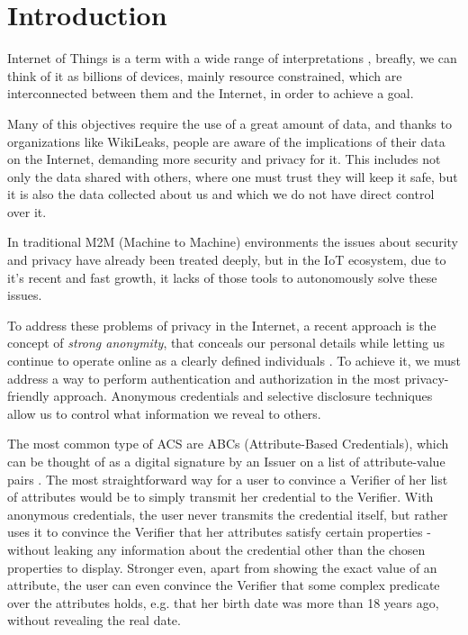 
\section{Introduction}

Internet of Things is a term with a wide range of interpretations \cite{Atzori20102787}, breafly, we can think of it as billions of devices, mainly resource constrained, which are interconnected between them and the Internet, in order to achieve a goal.

Many of this objectives require the use of a great amount of data, and thanks to organizations like WikiLeaks, people are aware of the implications of their data on the Internet, demanding more security and privacy for it. This includes not only the data shared with others, where one must trust they will keep it safe, but it is also the data collected about us and which we do not have direct control over it.

In traditional M2M (Machine to Machine) environments the issues about security and privacy have already been treated deeply, but in the IoT ecosystem, due to it's recent and fast growth, it lacks of those tools to autonomously solve these issues.

To address these problems of privacy in the Internet, a recent approach is the concept of \textit{strong anonymity}, that conceals our personal details while letting us continue to operate online as a clearly defined individuals \cite{stronganonymity}. To achieve it, we must address a way to perform authentication and authorization in the most privacy-friendly approach. Anonymous credentials and selective disclosure techniques allow us to control what information we reveal to others.

The most common type of ACS are ABCs (Attribute-Based Credentials), which can be thought of as a digital signature by an Issuer on a list of attribute-value pairs \cite{introCredIBM}.
The most straightforward way for a user to convince a Verifier of her list of attributes would be to simply transmit her credential to the Verifier.
With anonymous credentials, the user never transmits the credential itself, but rather uses it to convince the Verifier that her attributes satisfy certain properties - without leaking any information about the credential other than the chosen properties to display. 
Stronger even, apart from showing the exact value of an attribute, the user can even convince the
Verifier that some complex predicate over the attributes holds, e.g. that her birth date was more than 18 years ago, without revealing the real date.

